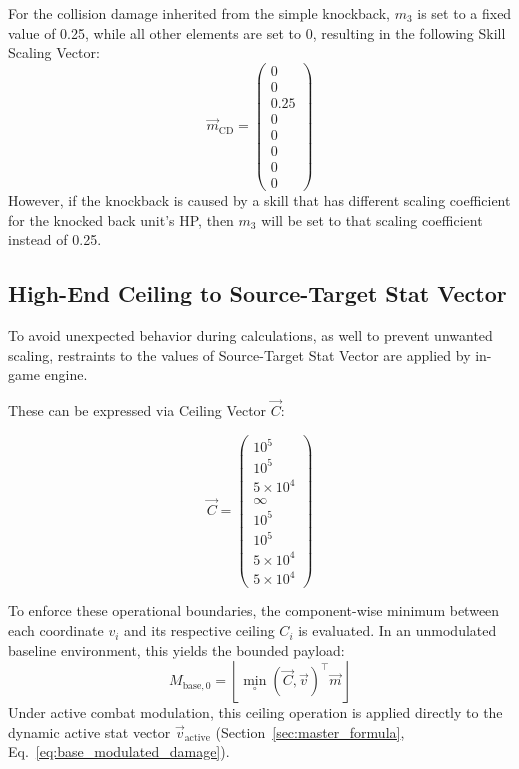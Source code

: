 \documentclass[twocolumn,10pt]{article}
\begin{document}
For the collision damage inherited from the simple knockback, $m_3$ is set to a fixed value of 0.25, while all other elements are set to 0, resulting in the following Skill Scaling Vector:
\begin{equation}
  \vec{m}_{\text{CD}} = \begin{pmatrix} 
  0 \\ 
  0 \\ 
  0.25 \\ 
  0 \\ 
  0 \\ 
  0 \\ 
  0 \\
  0
  \end{pmatrix}
\end{equation}
However, if the knockback is caused by a skill that has different scaling coefficient for the knocked back unit's HP, then $m_3$ will be set to that scaling coefficient instead of 0.25.

\subsection{High-End Ceiling to Source-Target Stat Vector}

To avoid unexpected behavior during calculations, as well to prevent unwanted scaling, restraints to the values of Source-Target Stat Vector are applied by in-game engine.

These can be expressed via Ceiling Vector $\vec{C}$:

\begin{equation}
  \vec{C} = \begin{pmatrix} 
  10^5\\ 
  10^5 \\ 
  5 \times 10^4 \\
  \infty \\ 
  10^5\\ 
  10^5 \\ 
  5 \times 10^4 \\
  5 \times 10^4
  \end{pmatrix}
\end{equation}

To enforce these operational boundaries, the component-wise minimum between each coordinate $v_i$ and its respective ceiling $C_i$ is evaluated. In an unmodulated baseline environment, this yields the bounded payload:
\begin{equation}
\label{eq:base_unmodulated}
M_{\text{base}, 0} = \left\lfloor \min_\circ \left(\vec{C}, \vec{v} \right)^\top \vec{m} \right\rfloor
\end{equation}
Under active combat modulation, this ceiling operation is applied directly to the dynamic active stat vector $\vec{v}_{\text{active}}$ (Section~\ref{sec:master_formula}, Eq.~\ref{eq:base_modulated_damage}).
\end{document}
